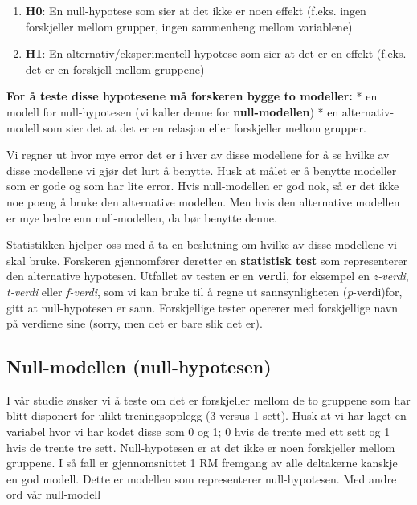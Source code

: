 \documentclass[
]{book}
\providecommand{\tightlist}{%
  \setlength{\itemsep}{0pt}\setlength{\parskip}{0pt}}
\begin{document}
\begin{enumerate}
\def\labelenumi{\arabic{enumi}.}
\tightlist
\item
  \textbf{H0}: En null-hypotese som sier at det ikke er noen effekt (f.eks. ingen forskjeller mellom grupper, ingen sammenheng mellom variablene)
\item
  \textbf{H1}: En alternativ/eksperimentell hypotese som sier at det er en effekt (f.eks. det er en forskjell mellom gruppene)
\end{enumerate}

\textbf{For å teste disse hypotesene må forskeren bygge to modeller:}
* en modell for null-hypotesen (vi kaller denne for \textbf{null-modellen})
* en alternativ-modell som sier det at det er en relasjon eller forskjeller mellom grupper.

Vi regner ut hvor mye error det er i hver av disse modellene for å se hvilke av disse modellene vi gjør det lurt å benytte. Husk at målet er å benytte modeller som er gode og som har lite error. Hvis null-modellen er god nok, så er det ikke noe poeng å bruke den alternative modellen. Men hvis den alternative modellen er mye bedre enn null-modellen, da bør benytte denne.

Statistikken hjelper oss med å ta en beslutning om hvilke av disse modellene vi skal bruke. Forskeren gjennomfører deretter en \textbf{statistisk test} som representerer den alternative hypotesen. Utfallet av testen er en \textbf{verdi}, for eksempel en \emph{z-verdi}, \emph{t-verdi} eller \emph{f-verdi}, som vi kan bruke til å regne ut sannsynligheten (\emph{p}-verdi)for, gitt at null-hypotesen er sann. Forskjellige tester opererer med forskjellige navn på verdiene sine (sorry, men det er bare slik det er).

\hypertarget{null-modellen-null-hypotesen}{%
\subsection{Null-modellen (null-hypotesen)}\label{null-modellen-null-hypotesen}}

I vår studie ønsker vi å teste om det er forskjeller mellom de to gruppene som har blitt disponert for ulikt treningsopplegg (3 versus 1 sett). Husk at vi har laget en variabel hvor vi har kodet disse som 0 og 1; 0 hvis de trente med ett sett og 1 hvis de trente tre sett. Null-hypotesen er at det ikke er noen forskjeller mellom gruppene. I så fall er gjennomsnittet 1 RM fremgang av alle deltakerne kanskje en god modell. Dette er modellen som representerer null-hypotesen. Med andre ord vår null-modell
\end{document}
